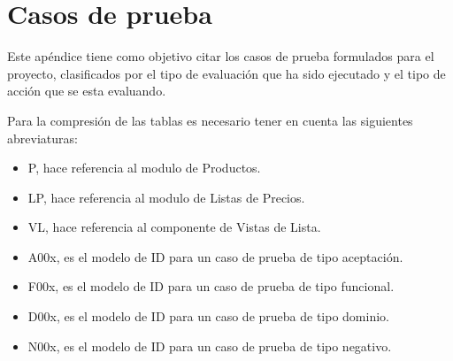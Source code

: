 \chapter{Casos de prueba}\label{appendix_testscases}
Este apéndice tiene como objetivo citar los casos de prueba formulados para el
proyecto, clasificados por el tipo de evaluación que ha sido ejecutado y el tipo
de acción que se esta evaluando.

Para la compresión de las tablas es necesario tener en cuenta las siguientes
abreviaturas:

\begin{itemize}
    \item P, hace referencia al modulo de Productos.
    \item LP, hace referencia al modulo de Listas de Precios.
    \item VL, hace referencia al componente de Vistas de Lista.
    \item A00x, es el modelo de ID para un caso de prueba de tipo aceptación.
    \item F00x, es el modelo de ID para un caso de prueba de tipo funcional.
    \item D00x, es el modelo de ID para un caso de prueba de tipo dominio.
    \item N00x, es el modelo de ID para un caso de prueba de tipo negativo.
\end{itemize}

